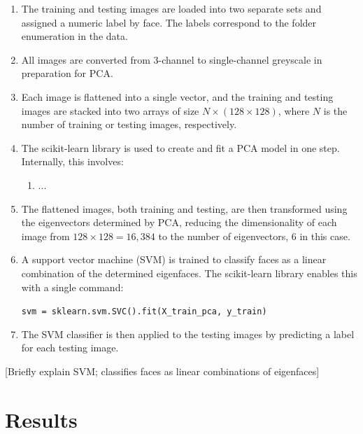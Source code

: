 \begin{enumerate}
  \item The training and testing images are loaded into two separate sets and assigned a numeric label by face. The labels correspond to the folder enumeration in the data.

  \item All images are converted from 3-channel to single-channel greyscale in preparation for PCA.

  \item Each image is flattened into a single vector, and the training and testing images are stacked into two arrays of size $N\times(128\times128)$, where $N$ is the number of training or testing images, respectively.

  \item The scikit-learn library is used to create and fit a PCA model in one step. Internally, this involves:

  \begin{enumerate}
    \item ...

  \end{enumerate}

  \item The flattened images, both training and testing, are then transformed using the eigenvectors determined by PCA, reducing the dimensionality of each image from $128\times128=16,384$ to the number of eigenvectors, 6 in this case.

  \item A support vector machine (SVM) is trained to classify faces as a linear combination of the determined eigenfaces. The scikit-learn library enables this with a single command:

  \begin{center}
    \texttt{svm = sklearn.svm.SVC().fit(X\_train\_pca, y\_train)}
  \end{center}

  \item The SVM classifier is then applied to the testing images by predicting a label for each testing image.

\end{enumerate}

[Briefly explain SVM; classifies faces as linear combinations of eigenfaces]

\newpage
\section{Results}

